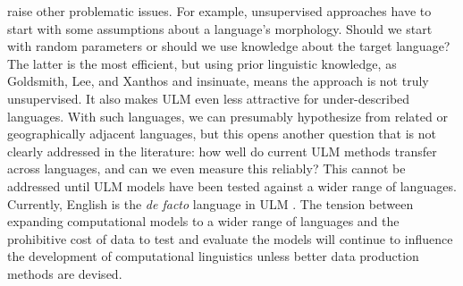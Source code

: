 \documentclass[12pt]{article}
\begin{document}
 raise other problematic issues. For example, unsupervised approaches have to start with some assumptions about a language's morphology. Should we start with random parameters or should we use knowledge about the target language? The latter is the most efficient, but using prior linguistic knowledge, as Goldsmith, Lee, and Xanthos and  insinuate, means the approach is not truly unsupervised. It also makes ULM even less attractive for under-described languages. With such languages, we can presumably hypothesize from related or geographically adjacent languages, but this opens another question that is not clearly addressed in the literature: how well do current ULM methods transfer across languages, and can we even measure this reliably? This cannot be addressed until ULM models have been tested against a wider range of languages. Currently, English is the \textit{de facto} language in ULM \cite{palmer_computational_2010}. The tension between expanding computational models to a wider range of languages and the prohibitive cost of data to test and evaluate the models will continue to influence the development of computational linguistics unless  better data production methods are devised.
\end{document}
